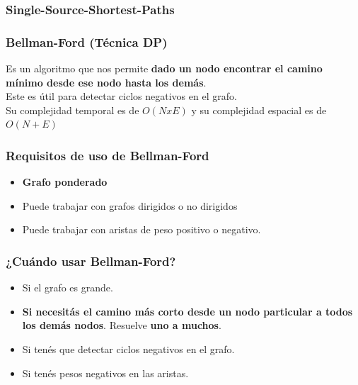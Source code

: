 \documentclass[10pt,a4paper]{article}
\begin{document}
\subsubsection*{Single-Source-Shortest-Paths}
\subsubsection*{Bellman-Ford (Técnica DP)}
Es un algoritmo que nos permite \textbf{dado un nodo encontrar el camino mínimo desde ese nodo hasta los demás}. \\
Este es útil para detectar ciclos negativos en el grafo. \\
Su complejidad temporal es de $O(N x E)$ y su complejidad espacial es de $O(N + E)$  
\subsubsection*{Requisitos de uso de Bellman-Ford}
\begin{itemize}
    \item \textbf{Grafo ponderado}
    \item Puede trabajar con grafos dirigidos o no dirigidos 
    \item Puede trabajar con aristas de peso positivo o negativo.
\end{itemize}
\subsubsection*{¿Cuándo usar Bellman-Ford?}
\begin{itemize}
    \item Si el grafo es grande. 
    \item \textbf{Si necesitás el camino más corto desde un nodo particular a todos los demás nodos}. Resuelve \textbf{uno a muchos}.
    \item Si tenés que detectar ciclos negativos en el grafo.
    \item Si tenés pesos negativos en las aristas.
\end{itemize}
\end{document}
